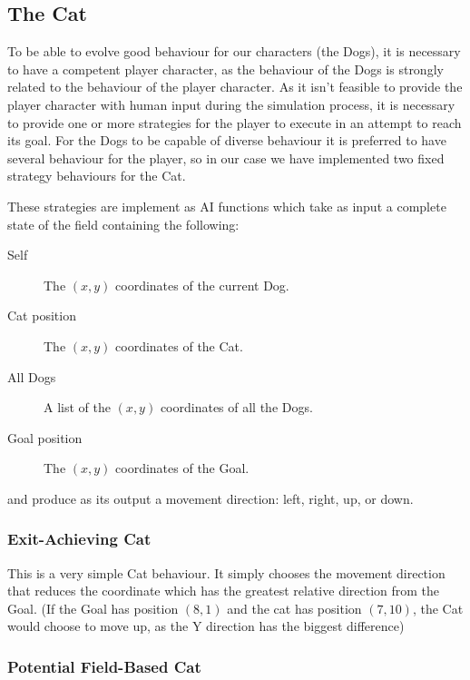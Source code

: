 \subsection{The Cat}
\label{sec:cat}

To be able to evolve good behaviour for our characters (the Dogs), it is
necessary to have a competent player character, as the behaviour of the Dogs is
strongly related to the behaviour of the player character. As it isn't feasible
to provide the player character with human input during the simulation process,
it is necessary to provide one or more strategies for the player to execute in
an attempt to reach its goal. For the Dogs to be capable of diverse behaviour it
is preferred to have several behaviour for the player, so in our case we have
implemented two fixed strategy behaviours for the Cat.

These strategies are implement as AI functions which take as input a complete
state of the field containing the following:
\begin{description}
\item[Self] The \((x,y)\) coordinates of the current Dog.
\item[Cat position] The \((x,y)\) coordinates of the Cat.
\item[All Dogs] A list of the \((x,y)\) coordinates of all the Dogs.
\item[Goal position] The \((x,y)\) coordinates of the Goal.
\end{description}

and produce as its output a movement direction: left, right, up, or down.



\subsubsection{Exit-Achieving Cat}
\label{sec:exit-achieving-cat}

This is a very simple Cat behaviour. It simply chooses the movement direction
that reduces the coordinate which has the greatest relative direction from the
Goal. (If the Goal has position \((8,1)\) and the cat has position \((7,10)\),
the Cat would choose to move up, as the Y direction has the biggest difference)

\subsubsection{Potential Field-Based Cat}
\label{sec:potent-field-based}

